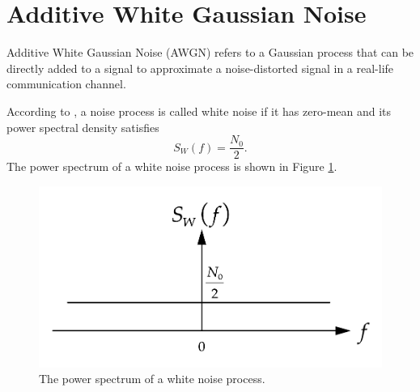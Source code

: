 \documentclass[../ECE459FinalProjectReport.tex]{subfiles}
\begin{document}
\section{Additive White Gaussian Noise}
Additive White Gaussian Noise (AWGN) refers to a Gaussian process that can be directly added to a signal to approximate a noise-distorted signal in a real-life communication channel.

According to \cite[Sec. 8.10]{haykinIntroductionAnalogDigital2007}, a noise process is called white noise if it has zero-mean and its power spectral density satisfies
\begin{equation}
    S_W\left(f\right) = \frac{N_0}{2}.
\end{equation}
The power spectrum of a white noise process is shown in Figure \ref{fig:white-noise-spectrum}.
\begin{figure}[tb]
    \centering
    \includegraphics[scale=0.35]{plots/white-noise-power-spectrum.pdf}
    \caption{The power spectrum of a white noise process.}
    \label{fig:white-noise-spectrum}
\end{figure}
\end{document}
